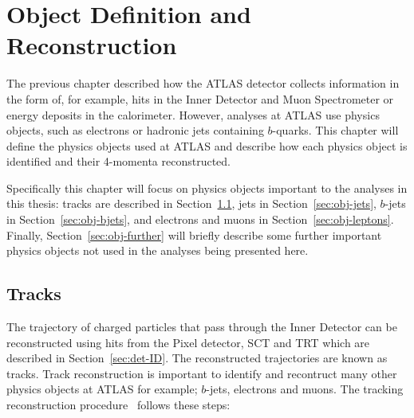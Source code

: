 \chapter{Object Definition and Reconstruction}
\label{sec:obj}

The previous chapter described how the ATLAS detector collects information
in the form of, for example, hits in the Inner Detector and Muon Spectrometer
or energy deposits in the calorimeter.
However, analyses at ATLAS use physics objects, such as electrons or hadronic jets containing $b$-quarks.
This chapter will define the physics objects used at ATLAS
and describe how each physics object is identified and their 4-momenta reconstructed.

Specifically this chapter will focus on physics objects important to the analyses in this thesis:
tracks are described in Section~\ref{sec:obj-tracks}, jets in Section~\ref{sec:obj-jets},
$b$-jets in Section~\ref{sec:obj-bjets}, and electrons and muons in Section~\ref{sec:obj-leptons}.
Finally, Section~\ref{sec:obj-further} will briefly describe some further important physics objects
not used in the analyses being presented here.

\section{Tracks}
\label{sec:obj-tracks}

The trajectory of charged particles that pass through the Inner Detector can be reconstructed
using hits from the Pixel detector, SCT and TRT which are described in Section~\ref{sec:det-ID}.
The reconstructed trajectories are known as tracks.
Track reconstruction is important to identify and recontruct many other physics objects at ATLAS
for example; $b$-jets, electrons and muons.
The tracking reconstruction procedure~\cite{obj-tracks_TIDE} follows these steps:

